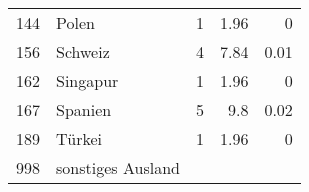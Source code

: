\begin{longtable}{lXrrr}
     144 &
     \multicolumn{1}{X}{ Polen   } &


       \num{1} &
       \num[round-mode=places,round-precision=2]{1.96} &
         \num[round-mode=places,round-precision=2]{0} \\

     156 &
     \multicolumn{1}{X}{ Schweiz   } &


       \num{4} &
       \num[round-mode=places,round-precision=2]{7.84} &
         \num[round-mode=places,round-precision=2]{0.01} \\

     162 &
     \multicolumn{1}{X}{ Singapur   } &


       \num{1} &
       \num[round-mode=places,round-precision=2]{1.96} &
         \num[round-mode=places,round-precision=2]{0} \\

     167 &
     \multicolumn{1}{X}{ Spanien   } &


       \num{5} &
       \num[round-mode=places,round-precision=2]{9.8} &
         \num[round-mode=places,round-precision=2]{0.02} \\

     189 &
     \multicolumn{1}{X}{ Türkei   } &


       \num{1} &
       \num[round-mode=places,round-precision=2]{1.96} &
         \num[round-mode=places,round-precision=2]{0} \\

     998 &
     \multicolumn{1}{X}{ sonstiges Ausland   } &



\end{longtable}
